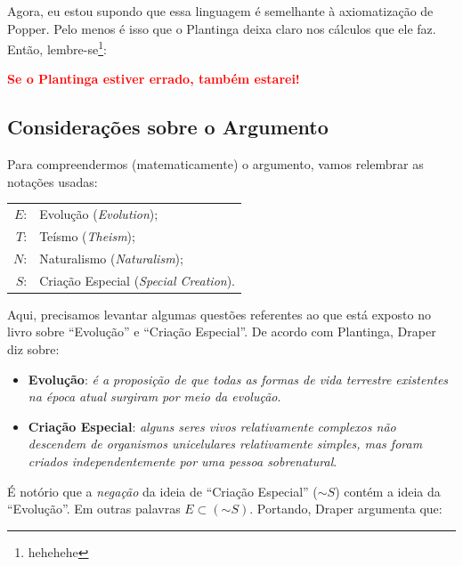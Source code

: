 \documentclass[12pt]{article}
\theoremstyle{definition}
\newcommand{\N}{\ensuremath{\sim\!}}
\begin{document}
		Agora, eu estou supondo que essa linguagem é semelhante à axiomatização de
		Popper.
		Pelo menos é isso que o Plantinga deixa claro nos cálculos que ele faz.
		Então, lembre-se\footnote{hehehehe}:
		
		\begin{center}
		 \Ovalbox
		 {
		  \textbf{\textcolor{red}{Se o Plantinga estiver errado, também estarei!}}
		 }
		\end{center}
		
	\subsection{Considerações sobre o Argumento}
	
	 Para compreendermos (matematicamente) o argumento, vamos relembrar as notações
		usadas: 
		
		\begin{center}
		 \begin{tabular}{rl}
		  $E$: & Evolução (\textit{Evolution});\\
			 $T$: & Teísmo (\textit{Theism});\\
			 $N$: & Naturalismo (\textit{Naturalism});\\
			 $S$: & Criação Especial (\textit{Special Creation}).
		 \end{tabular}
		\end{center}
		
		Aqui, precisamos levantar algumas questões referentes ao que está exposto no
		livro sobre ``Evolução'' e ``Criação Especial''.
		De acordo com Plantinga, Draper diz sobre:
		
		\begin{itemize}
		 \item \textbf{Evolução}: \textit{é a proposição de que todas as formas de 
			vida terrestre existentes na época atual surgiram por meio da evolução}.
			\item \textbf{Criação Especial}: \textit{alguns seres vivos relativamente 
			complexos não descendem de organismos unicelulares relativamente simples, 
			mas foram criados independentemente por uma pessoa sobrenatural}.
		\end{itemize}
		
		É notório que a \textit{negação} da ideia de ``Criação Especial'' ($ \N S $)
		contém a ideia da ``Evolução''.
		Em outras palavras $E \subset (\N S)$.
		Portando, Draper argumenta que:
		
\end{document}
